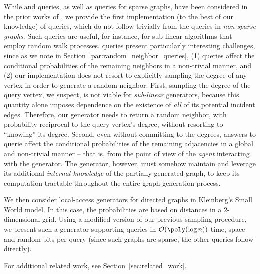 While  and  queries, as well as  queries for sparse graphs, have been considered in the prior works of \cite{reut, huge_old, huge, sparse}, we provide the first implementation (to the best of our knowledge)
of  queries, which do not follow trivially from the
 queries in \emph{non-sparse graphs}.
Such queries are useful, for instance, for sub-linear algorithms that employ random walk processes.
 queries
present particularly interesting challenges,  since as we note in 
Section~\ref{par:random_neighbor_queries},
(1)  queries affect the conditional probabilities
of the remaining neighbors in a non-trivial manner, and
(2) our implementation does not resort to explicitly sampling the degree of any vertex in order to generate a random neighbor.
First, sampling the degree of the query vertex, we suspect, is not viable for \emph{sub-linear} generators,
because this quantity alone imposes dependence on the existence of \emph{all} of its potential incident edges.
Therefore, our generator needs to return a random neighbor, with probability reciprocal to the query vertex's degree,
without resorting to ``knowing'' its degree.
Second, even without committing to the degrees, answers to  querie
affect the conditional probabilities of the remaining adjacencies in a global and non-trivial manner
-- that is, from the point of view of the \emph{agent} interacting with the generator.
The generator, however, must somehow maintain and leverage its additional \emph{internal knowledge}
of the partially-generated graph, to keep its computation tractable throughout the entire graph generation process.

We then consider local-access generators for directed graphs in Kleinberg's Small World model.
In this case, the probabilities are based on distances in a 2-dimensional grid.
Using a modified version of our previous sampling procedure,
we present such a generator supporting  queries in 
$\mathcal{O}(\poly(\log n))$ time, space and random bits per query (since such graphs
are sparse, the other queries follow directly).

For additional related work, see Section~\ref{sec:related_work}.

%

%
